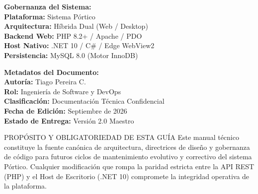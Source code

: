 \documentclass[11pt,a4paper,openany]{report}
\begin{document}
\begin{titlepage}
\begin{minipage}{0.84\textwidth}
        \begin{minipage}[t]{0.48\textwidth}
            \textbf{\color{midnightnavy}Gobernanza del Sistema:}\\[0.2cm]
            \textbf{Plataforma:} Sistema Pórtico\\
            \textbf{Arquitectura:} Híbrida Dual (Web / Desktop)\\
            \textbf{Backend Web:} PHP 8.2+ / Apache / PDO\\
            \textbf{Host Nativo:} .NET 10 / C\# / Edge WebView2\\
            \textbf{Persistencia:} MySQL 8.0 (Motor InnoDB)
        \end{minipage}
        \hfill
        \begin{minipage}[t]{0.48\textwidth}
            \textbf{\color{midnightnavy}Metadatos del Documento:}\\[0.2cm]
            \textbf{Autoría:} Tiago Pereira C.\\
            \textbf{Rol:} Ingeniería de Software y DevOps\\
            \textbf{Clasificación:} Documentación Técnica Confidencial\\
            \textbf{Fecha de Edición:} Septiembre de 2026\\
            \textbf{Estado de Entrega:} Versión 2.0 Maestro
        \end{minipage}

        \vfill
        \vspace*{3.5cm}

        \begin{modernbox}{PROPÓSITO Y OBLIGATORIEDAD DE ESTA GUÍA}
            Este manual técnico constituye la fuente canónica de arquitectura, directrices de diseño y gobernanza de código para futuros ciclos de mantenimiento evolutivo y correctivo del sistema Pórtico. Cualquier modificación que rompa la paridad estricta entre la API REST (PHP) y el Host de Escritorio (.NET 10) compromete la integridad operativa de la plataforma.
        \end{modernbox}
    \end{minipage}
\end{titlepage}
\nopagecolor

\tableofcontents
\newpage
\listoffigures
\listoftables
\newpage
\end{document}
